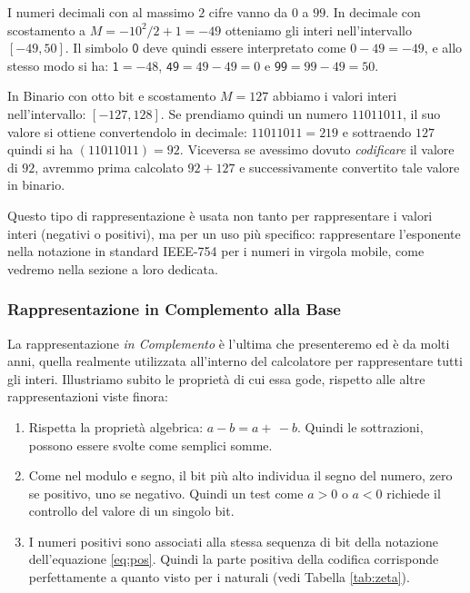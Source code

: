 \begin{ex} I numeri decimali con al massimo $2$ cifre vanno da $0$ a $99$. In decimale con scostamento a $M = -10^2/2 + 1 = -49$ otteniamo gli interi nell'intervallo $[-49,50]$. Il simbolo $\mathsf 0$ deve quindi essere interpretato come $0-49 = -49$, e allo stesso modo si ha: $\mathsf{1} = -48$, $\mathsf{49} = 49 - 49 = 0$ e $\mathsf{99} = 99 - 49 = 50$.

In Binario con otto bit e scostamento $M = 127$ abbiamo i valori interi nell'intervallo: $[-127,128]$. Se prendiamo quindi un numero $11011011$, il suo valore si ottiene convertendolo in decimale:
$11011011 = 219$ e sottraendo $127$ quindi si ha $(11011011) = 92$. Viceversa se avessimo dovuto \emph{codificare} il valore di $92$, avremmo prima calcolato $92+127$ e successivamente convertito tale valore in binario.
\end{ex}\medskip

Questo tipo di rappresentazione è usata non tanto per rappresentare i valori interi (negativi o positivi), ma per un uso più specifico: rappresentare l'esponente nella notazione in standard \textrm{IEEE-754} per i numeri in virgola mobile, come vedremo nella sezione a loro dedicata.

\subsubsection{Rappresentazione in Complemento alla Base}


La rappresentazione \emph{in Complemento} è l'ultima che presenteremo ed è da molti anni, quella realmente utilizzata all'interno del calcolatore per
rappresentare tutti gli interi. Illustriamo subito le proprietà
di cui essa gode, rispetto alle altre rappresentazioni viste finora:
\begin{enumerate}
	\item Rispetta la proprietà algebrica:  $a - b = a +\, -b$. Quindi le sottrazioni, possono essere svolte come semplici somme.
	\item Come nel modulo e segno, il bit più alto individua il segno del numero, zero se positivo, uno se negativo. Quindi un test come $a > 0$ o $a < 0$
	richiede il controllo del valore di un singolo bit.
	\item I numeri positivi sono associati alla stessa sequenza di bit della notazione dell'equazione \eqref{eq:pos}. Quindi la parte positiva della
	codifica corrisponde perfettamente a quanto visto per i naturali (vedi Tabella \ref{tab:zeta}).
\end{enumerate}

